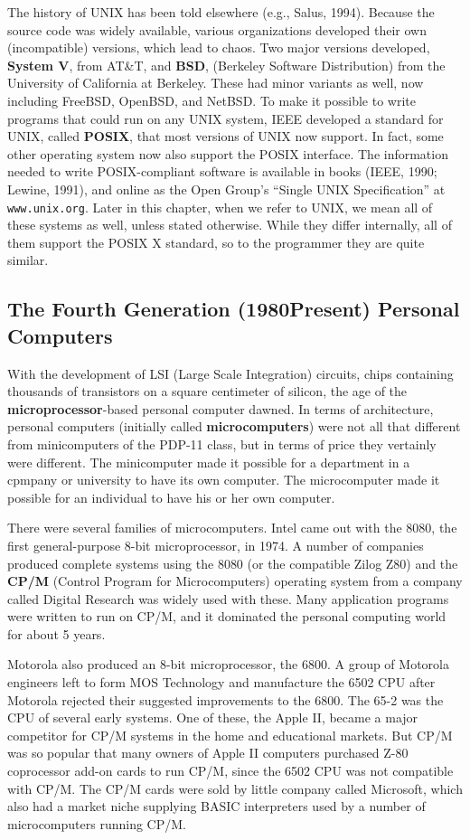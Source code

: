 \documentclass{book}
\newcommand {\kw}  [1] {\textbf{#1}}
\newcommand {\www} [1] {\texttt{#1}}
\begin{document}
The history of UNIX has been told elsewhere (e.g., Salus, 1994).
Because the source code was widely available, various organizations developed their own (incompatible) versions, which lead to chaos.
Two major versions developed, \kw{System V}, from AT\&T, and \kw{BSD}, (Berkeley Software Distribution) from the University of California at Berkeley.
These had minor variants as well, now including FreeBSD, OpenBSD, and NetBSD.
To make it possible to write programs that could run on any UNIX system, IEEE developed a standard for UNIX, called \kw{POSIX},
that most versions of UNIX now support.
In fact, some other operating system now also support the POSIX interface.
The information needed to write POSIX-compliant software is available in books (IEEE, 1990; Lewine, 1991),
and online as the Open Group's ``Single UNIX Specification'' at \www{www.unix.org}.
Later in this chapter, when we refer to UNIX, we mean all of these systems as well, unless stated otherwise.
While they differ internally, all of them support the POSIX X standard, so to the programmer they are quite similar.

\subsection{The Fourth Generation (1980Present) Personal Computers}
With the development of LSI (Large Scale Integration) circuits, chips containing thousands of transistors on a square centimeter of silicon,
the age of the \kw{microprocessor}-based personal computer dawned.
In terms of architecture, personal computers (initially called \kw{microcomputers}) were not all that different from minicomputers of the PDP-11 class, 
but in terms of price they vertainly were different.
The minicomputer made it possible for a department in a cpmpany or university to have its own computer.
The microcomputer made it possible for an individual to have his or her own computer.

There were several families of microcomputers.
Intel came out with the 8080, the first general-purpose 8-bit microprocessor, in 1974.
A number of companies produced complete systems using the 8080 (or the compatible Zilog Z80) 
and the \kw{CP/M} (Control Program for Microcomputers) operating system from a company called Digital Research was widely used with these.
Many application programs were written to run on CP/M, and it dominated the personal computing world for about 5 years.

Motorola also produced an 8-bit microprocessor, the 6800.
A group of Motorola engineers left to form MOS Technology and manufacture the 6502 CPU after Motorola rejected their suggested improvements to the 6800.
The 65-2 was the CPU of several early systems.
One of these, the Apple II, became a major competitor for CP/M systems in the home and educational markets.
But CP/M was so popular that many owners of Apple II computers purchased Z-80 coprocessor add-on cards to run CP/M, 
since the 6502 CPU was not compatible with CP/M.
The CP/M cards were sold by little company called Microsoft, which also had a market niche supplying BASIC interpreters 
used by a number of microcomputers running CP/M.
\end{document}
